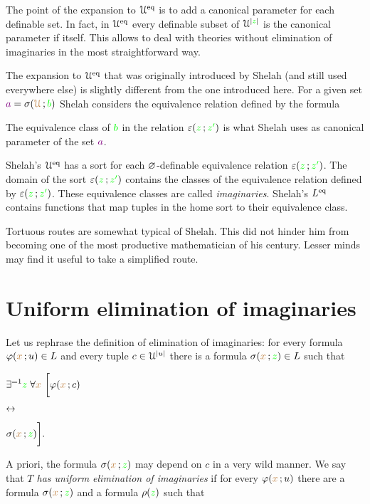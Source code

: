 \documentclass[creche.tex]{subfiles}
\begin{document}
The point of the expansion to $\EuScript U^{{\rm eq}}$ is to add a canonical parameter for each definable set. In fact, in $\EuScript U^{{\rm eq}}$ every definable subset of $\EuScript U^{|{\color{green} z}|}$ is the canonical parameter if itself. This allows to deal with theories without elimination of imaginaries in the most straightforward way.

The expansion to $\EuScript U^{{\rm eq}}$ that was originally introduced by Shelah (and still used everywhere else) is slightly different from the one introduced here. For a given set ${\color{violet} a}=\sigma({\color{brown}\EuScript U}\,;{\color{green} b})$ Shelah considers the equivalence relation defined by the formula


The equivalence class of ${\color{green} b}$ in the relation $\varepsilon({\color{green} z}\,;{\color{green} z'})$ is what Shelah uses as canonical parameter of the set ${\color{violet} a}$. 

Shelah's $\EuScript U^{{\rm eq}}$ has a sort for each $\varnothing$-definable equivalence relation $\varepsilon({\color{green} z}\,;{\color{green} z'})$. The domain of the sort $\varepsilon({\color{green} z}\,;{\color{green} z'})$ contains the classes of the equivalence relation defined by $\varepsilon({\color{green} z}\,;{\color{green} z'})$. These equivalence classes are called \emph{imaginaries}. Shelah's $L^{{\rm eq}}$ contains functions that map tuples in the home sort to their equivalence class.

Tortuous routes are somewhat typical of Shelah. This did not hinder him from becoming one of the most productive mathematician of his century. Lesser minds may find it useful to take a simplified route.


\section{Uniform elimination of imaginaries}

\def\medrel#1{\parbox[t]{5ex}{$\displaystyle\hfil #1$}}
\def\ceq#1#2#3{\parbox[t]{35ex}{$\displaystyle #1$}\medrel{#2}{$\displaystyle #3$}}


Let us rephrase the definition of elimination of imaginaries: for every formula $\varphi({\color{brown} x}\,;u)\in L$ and every tuple $c\in\EuScript U^{|u|}$ there is a formula $\sigma({\color{brown} x}\,;{\color{green} z})\in L$ such that

\ceq{\hfill\E^{=1} {\gr z}\;\A {\mr x}\ \bigg[\phi({\mr x}\,;c)}{\iff}{\sigma({\mr x}\,;{\gr z})\bigg].}

A priori, the formula $\sigma({\color{brown} x}\,;{\color{green} z})$ may depend on $c$ in a very wild manner. We say that \emph{$T$ has uniform elimination of imaginaries\/} if for every $\varphi({\color{brown} x}\,;u)$ there are a formula $\sigma({\color{brown} x}\,;{\color{green} z})$ and a formula $\rho({\color{green} z})$ such that 
\end{document}
